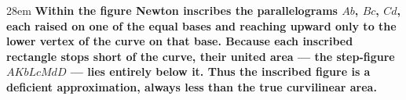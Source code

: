 \documentclass[border=4pt]{standalone}
\begin{document}
\begin{varwidth}{28em}
\large\bfseries
Within the figure Newton inscribes \textcolor{insc}{the parallelograms $Ab$, $Bc$, $Cd$},
each raised on one of the equal bases and reaching upward only to the lower vertex
of \textcolor{curve}{the curve} on that base.
Because \textcolor{insc}{each inscribed rectangle} stops short of \textcolor{curve}{the curve},
their united area — the step-figure $AKbLcMdD$ — lies \textcolor{insc}{entirely below} it.
Thus \textcolor{insc}{the inscribed figure} is a deficient approximation, always less than
the true curvilinear area.
\end{varwidth}
\end{document}
